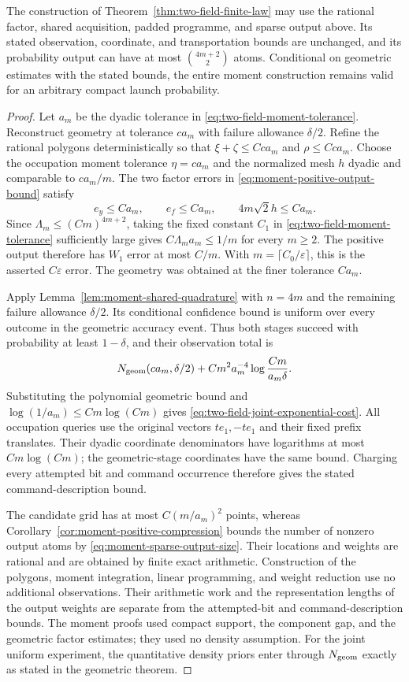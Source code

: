 \begin{proposition}
\label{prop:moment-complete-budget}
The construction of Theorem~\ref{thm:two-field-finite-law} may use
the rational factor, shared acquisition, padded programme, and
sparse output above.  Its stated observation, coordinate, and
transportation bounds are unchanged, and its probability output
can have at most $\binom{4m+2}{2}$ atoms.
Conditional on geometric estimates with the stated bounds, the
entire moment construction remains valid for an arbitrary compact
launch probability.
\end{proposition}
\begin{proof}
Let $a_m$ be the dyadic tolerance in
\eqref{eq:two-field-moment-tolerance}.  Reconstruct geometry at
tolerance $c a_m$ with failure allowance $\delta/2$.  Refine the
rational polygons deterministically so that $\xi+\zeta\le Cc a_m$
and $\rho\le Cc a_m$.  Choose the occupation moment tolerance
$\eta=c a_m$ and the normalized mesh $h$ dyadic and comparable
to $c a_m/m$.  The two factor errors in
\eqref{eq:moment-positive-output-bound} satisfy
\[
 e_y\le C a_m,\qquad e_f\le C a_m,
          \qquad 4m\sqrt2h\le C a_m.
\]
Since $\Lambda_m\le(Cm)^{4m+2}$, taking the fixed constant $C_1$
in \eqref{eq:two-field-moment-tolerance} sufficiently large gives
$C\Lambda_m a_m\le1/m$ for every $m\ge2$.  The positive output
therefore has $W_1$ error at most $C/m$.  With
$m=\lceil C_0/\varepsilon\rceil$, this is the asserted
$C\varepsilon$ error.  The geometry was obtained at the finer
tolerance $Ca_m$.

Apply Lemma~\ref{lem:moment-shared-quadrature} with $n=4m$ and
the remaining failure allowance $\delta/2$.  Its conditional
confidence bound is uniform over every outcome in the geometric
accuracy event.  Thus both stages succeed with probability at
least $1-\delta$, and their observation total is
\[
 N_{\rm geom}(c a_m,\delta/2)
          +Cm^2a_m^{-4}\log\frac{Cm}{a_m\delta}.
\]
Substituting the polynomial geometric bound and
$\log(1/a_m)\le C m\log(Cm)$ gives
\eqref{eq:two-field-joint-exponential-cost}.  All occupation
queries use the original vectors $te_1,-te_1$ and their fixed
prefix translates.  Their dyadic coordinate denominators have
logarithms at most $C m\log(Cm)$; the geometric-stage coordinates
have the same bound.  Charging every attempted bit and command
occurrence therefore gives the stated command-description bound.

The candidate grid has at most $C(m/a_m)^2$ points, whereas
Corollary~\ref{cor:moment-positive-compression} bounds the number
of nonzero output atoms by \eqref{eq:moment-sparse-output-size}.
Their locations and weights are rational and are obtained by
finite exact arithmetic.  Construction of the polygons, moment
integration, linear programming, and weight reduction use no
additional observations.  Their arithmetic work and the
representation lengths of the output weights are separate from
the attempted-bit and command-description bounds.  The moment
proofs used compact support, the component gap, and the geometric
factor estimates; they used no density assumption.  For the joint
uniform experiment, the quantitative density priors enter through
$N_{\rm geom}$ exactly as stated in the geometric theorem.
\end{proof}
